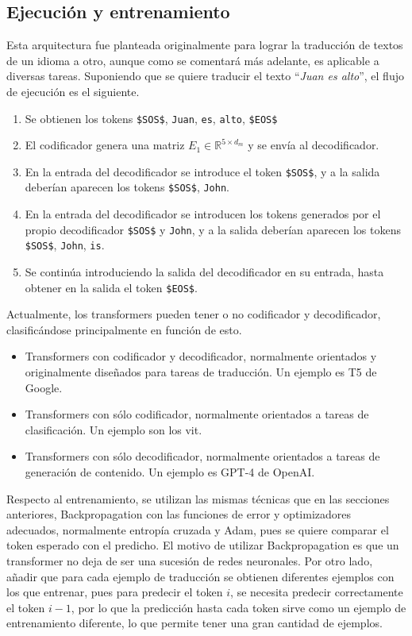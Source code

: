 			\subsection{Ejecución y entrenamiento}
			
				Esta arquitectura fue planteada originalmente para lograr la traducción de textos de un idioma a otro, aunque como se comentará más adelante, es aplicable a diversas tareas. Suponiendo que se quiere traducir el texto ``\textit{Juan es alto}'', el flujo de ejecución es el siguiente. 
				\begin{enumerate}[label = \textbf{\arabic*. }]
					\item Se obtienen los tokens \texttt{\$SOS\$}, \texttt{Juan}, \texttt{es}, \texttt{alto}, \texttt{\$EOS\$}
					\item El codificador genera una matriz $E_1 \in \mathbb{R}^{5 \times d_m}$ y se envía al decodificador. 
					\item En la entrada del decodificador se introduce el token \texttt{\$SOS\$}, y a la salida deberían aparecen los tokens \texttt{\$SOS\$}, \texttt{John}. 
					\item En la entrada del decodificador se introducen los tokens generados por el propio decodificador \texttt{\$SOS\$} y \texttt{John}, y a la salida deberían aparecen los tokens \texttt{\$SOS\$}, \texttt{John}, \texttt{is}.
					\item Se continúa introduciendo la salida del decodificador en su entrada, hasta obtener en la salida el token \texttt{\$EOS\$}.
				\end{enumerate}
				
				Actualmente, los transformers pueden tener o no codificador y decodificador, clasificándose principalmente en función de esto. 
				\begin{itemize}
					\item Transformers con codificador y decodificador, normalmente orientados y originalmente diseñados para tareas de traducción. Un ejemplo es T5 de Google. 
					\item Transformers con sólo codificador, normalmente orientados a tareas de clasificación. Un ejemplo son los \gls{vit}. 
					\item Transformers con sólo decodificador, normalmente orientados a tareas de generación de contenido. Un ejemplo es GPT-4 de OpenAI. 
				\end{itemize}
				
				Respecto al entrenamiento, se utilizan las mismas técnicas que en las secciones anteriores, Backpropagation con las funciones de error y optimizadores adecuados, normalmente entropía cruzada y Adam, pues se quiere comparar el token esperado con el predicho. El motivo de utilizar Backpropagation es que un transformer no deja de ser una sucesión de redes neuronales. Por otro lado, añadir que para cada ejemplo de traducción se obtienen diferentes ejemplos con los que entrenar, pues para predecir el token $i$, se necesita predecir correctamente el token $i-1$, por lo que la predicción hasta cada token sirve como un ejemplo de entrenamiento diferente, lo que permite tener una gran cantidad de ejemplos. 
				
